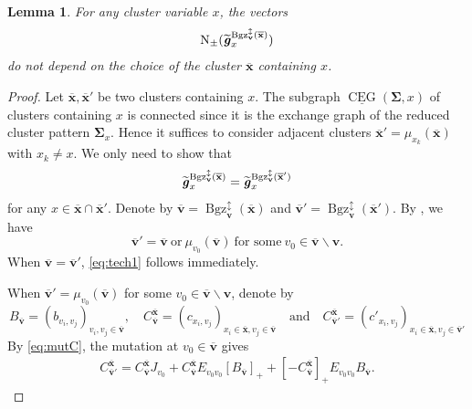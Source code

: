 \documentclass[11pt,reqno]{amsart}
\theoremstyle{plain}
\newtheorem{lemma}[theorem]{Lemma}
\theoremstyle{definition}
\numberwithin{equation}{section}
\newcommand\<{\langle}
\renewcommand\>{\rangle}
\newcommand{\CEG}{\operatorname{CEG}} %
\newcommand{\uCEG}{\underline{\CEG}} %
\newcommand{\on}[1]{\operatorname{#1}}
\def\vv{\mathbf{v}}
\newcommand{\flowdu}[1]{\on{evo}_{\updownarrow}^{#1}}
\newcommand{\bfit}[1]{\textbf{\textit{#1}}}
\newcommand{\ubf}[1]{\underline{\mathbf{#1}}}
\def\seeds{\mathbf{\Sigma}}
\def\xx{\mathbf{x}}%
\def\cvec{\bfit{c}}
\def\gvec{\bfit{g}}
\def\Cmat{{C}}
\def\opstar{\diamond}
\newcommand{\Bgzm}[2]{\operatorname{Bgz}^{\downarrow}_{#2}(#1)}
\newcommand{\Bgzpm}[2]{\operatorname{Bgz}^{\updownarrow}_{#2}(#1)}
\newcommand{\ol}[1]{\overline{#1}}
\def\normal{\on{N}}
\def\tgvec{\widetilde{\gvec}}
\begin{document}
\begin{lemma}\label{lem:well-define}
For any cluster variable $x$, the vectors
\begin{gather}\label{eq:Bgzpps}
    \normal_\pm(\tgvec^{\Bgzpm{\ol{\xx}}{\vv}}_x)
\end{gather}
do not depend on the choice of the cluster $\ol{\xx}$ containing $x$.
\end{lemma}

\begin{proof}
Let $\ol{\xx},\ol{\xx}'$ be two clusters containing $x$.
The subgraph $\uCEG(\seeds,x)$ of clusters containing $x$ is connected since it is the exchange graph of the reduced cluster pattern $\seeds_x$.
Hence it suffices to consider adjacent clusters $\ol{\xx}'=\mu_{x_k}(\ol{\xx})$ with $x_k\ne x$.
We only need to show that
\begin{gather}\label{eq:tech1}
    \tgvec^{\Bgzpm{\ol{\xx}}{\vv}}_x=\tgvec^{\Bgzpm{\ol{\xx}'}{\vv}}_x
\end{gather}
for any $x\in\ol{\xx}\cap\ol{\xx}'$.
Denote by $\ol{\vv}=\Bgzpm{\ol{\xx}}{\vv}$ and $\ol{\vv}'=\Bgzpm{\ol{\xx}'}{\vv}$.
By , we have
\[
\ol{\vv}'=\ol{\vv}~\text{or}~\mu_{v_0}(\ol{\vv})~\text{for some}~v_0\in \ol{\vv} \backslash\vv.
\]
When $\ol{\vv}=\ol{\vv}'$, \eqref{eq:tech1} follows immediately.

When $\ol{\vv}'=\mu_{v_0}(\ol{\vv})$ for some $v_0\in \ol{\vv} \backslash\vv$, 
denote by 
\[
B_{\ol{\vv}}=(b_{v_i, v_j})_{v_i,v_j\in\ol{\vv}},\quad
\Cmat_{\ol{\vv}}^{\ol{\xx}}=(c_{x_i,v_j})_{x_i\in\ol{\xx},v_j\in\ol{\vv}}\quad\text{and}\quad
\Cmat_{\ol{\vv}'}^{\ol{\xx}}=(c'_{x_i,v_j })_{x_i\in\ol{\xx},v_j\in\ol{\vv}'}
\]
By \eqref{eq:mutC}, the mutation at $v_0\in\ol{\vv}$ gives
\begin{gather}\label{eq:C0}
     \Cmat_{\ol{\vv}'}^{\ol{\xx}} =
    \Cmat_{\ol{\vv}}^{\ol{\xx}}J_{v_0} +
    \Cmat_{\ol{\vv}}^{\ol{\xx}} E_{v_0 v_0} [B_{\ol{\vv}}]_+ +
    [-\Cmat_{\ol{\vv}}^{\ol{\xx}}]_+ E_{v_0 v_0} B_{\ol{\vv}}.
\end{gather}


\end{proof}
\end{document}
